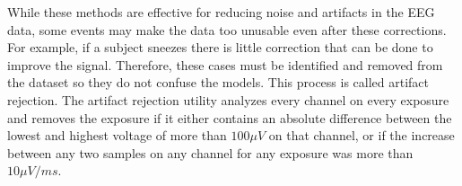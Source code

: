 While these methods are effective for reducing noise and artifacts in the EEG data, some events may make the data too unusable even after these corrections. For example, if a subject sneezes there is little correction that can be done to improve the signal. Therefore, these cases must be identified and removed from the dataset so they do not confuse the models. This process is called artifact rejection. The artifact rejection utility analyzes every channel on every exposure and removes the exposure if it either contains an absolute difference between the lowest and highest voltage of more than $100{\mu}V$ on that channel, or if the increase between any two samples on any channel for any exposure was more than $10{\mu}V/ms$. 
